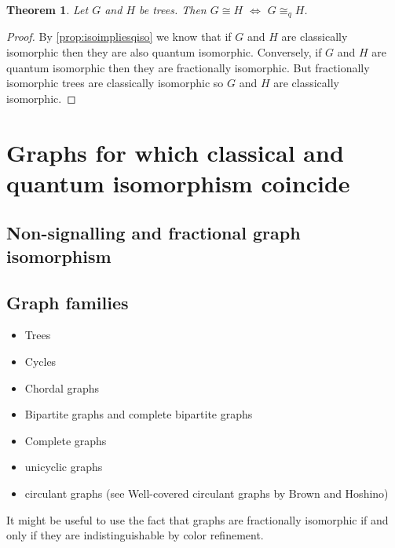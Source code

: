 \documentclass[12pt]{article}
\newtheorem{Theorem}{Theorem}
\theoremstyle{definition}
\theoremstyle{proposition}
\theoremstyle{lemma}
\begin{document}
\begin{Theorem}
Let $G$ and $H$ be trees. Then $G \cong H$ $\Leftrightarrow$ $G \cong_q H$.
\end{Theorem}
\begin{proof}
By \cref{prop:isoimpliesqiso} we know that if $G$ and $H$ are classically isomorphic then they are also quantum isomorphic. Conversely, if $G$ and $H$ are quantum isomorphic then they are fractionally isomorphic. But fractionally isomorphic trees are classically isomorphic so $G$ and $H$ are classically isomorphic.
\end{proof}

\section{Graphs for which classical and quantum isomorphism coincide}

\subsection{Non-signalling and fractional graph isomorphism}

\subsection{Graph families}

\begin{itemize}
\item Trees
\item Cycles
\item Chordal graphs
\item Bipartite graphs and complete bipartite graphs
\item Complete graphs 
\item unicyclic graphs
\item circulant graphs (see Well-covered circulant graphs by Brown and Hoshino)
\end{itemize}

It might be useful to use the fact that graphs are fractionally isomorphic if and only if they are indistinguishable by color refinement.

\newpage



\end{document}
